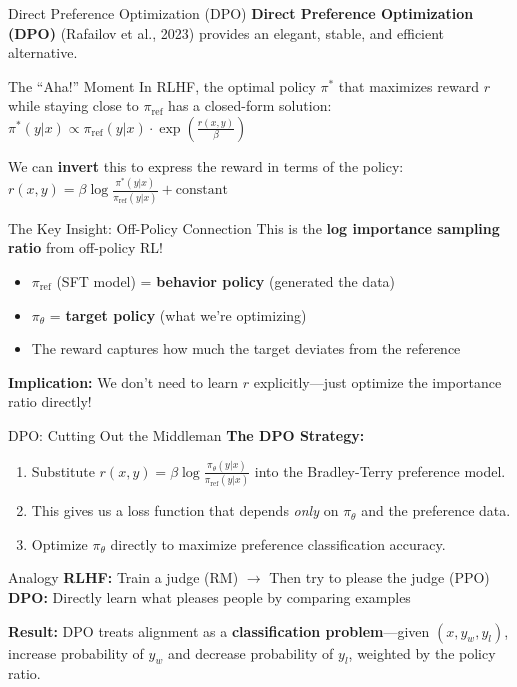 \documentclass[xcolor=svgnames, 10pt, handout]{beamer}
\begin{document}
\begin{frame}{Direct Preference Optimization (DPO)}
    \textbf{Direct Preference Optimization (DPO)} (Rafailov et al., 2023) provides an elegant, stable, and efficient alternative.
    \pause

    \begin{block}{The ``Aha!'' Moment}
        In RLHF, the optimal policy $\pi^*$ that maximizes reward $r$ while staying close to $\pi_{\text{ref}}$ has a closed-form solution:
        $ \pi^*(y|x) \propto \pi_{\text{ref}}(y|x) \cdot \exp\left(\frac{r(x,y)}{\beta}\right) $
    \end{block}
    \pause

    We can \textbf{invert} this to express the reward in terms of the policy:
    $ r(x,y) = \beta \log \frac{\pi^*(y|x)}{\pi_{\text{ref}}(y|x)} + \text{constant} $
    \pause

    \begin{alertblock}{The Key Insight: Off-Policy Connection}
    This is the \textbf{log importance sampling ratio} from off-policy RL!
    \begin{itemize}
        \item $\pi_{\text{ref}}$ (SFT model) = \textbf{behavior policy} (generated the data)
        \item $\pi_\theta$ = \textbf{target policy} (what we're optimizing)
        \item The reward captures how much the target deviates from the reference
    \end{itemize}
    \end{alertblock}
    \pause

    \textbf{Implication:} We don't need to learn $r$ explicitly---just optimize the importance ratio directly!
\end{frame}

\begin{frame}{DPO: Cutting Out the Middleman}
    \textbf{The DPO Strategy:}
    \pause
    \begin{enumerate}
        \item Substitute $r(x,y) = \beta \log \frac{\pi_\theta(y|x)}{\pi_{\text{ref}}(y|x)}$ into the Bradley-Terry preference model.
        \pause
        \item This gives us a loss function that depends \textit{only} on $\pi_\theta$ and the preference data.
        \pause
        \item Optimize $\pi_\theta$ directly to maximize preference classification accuracy.
    \end{enumerate}
    \pause

    \begin{block}{Analogy}
        \textbf{RLHF:} Train a judge (RM) $\rightarrow$ Then try to please the judge (PPO) \\[0.2cm]
        \textbf{DPO:} Directly learn what pleases people by comparing examples
    \end{block}
    \pause

    \textbf{Result:} DPO treats alignment as a \textbf{classification problem}---given $(x, y_w, y_l)$, increase probability of $y_w$ and decrease probability of $y_l$, weighted by the policy ratio.
\end{frame}
\end{document}
